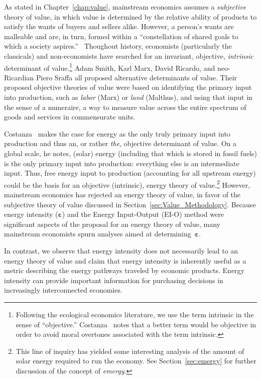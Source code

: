 As stated in Chapter~\ref{chap:value}, mainstream economics assumes a
\emph{subjective} theory of value, 
in which value is determined by the relative ability 
of products to satisfy the wants of buyers and sellers alike.
However, a person's wants are malleable and are, in turn, formed within a 
``constellation of shared goals to which a society aspires.''~\cite{Costanza:2004we}
Thoughout history, economists (particularly the classicals) 
and non-economists have searched for an invariant, objective, 
\emph{intrinsic} determinant of value.\footnote{Following the ecological economics literature, 
	we use the term intrinsic in the sense of ``objective.'' Costanza~\cite{Costanza:2004we} 
	notes that a better term would be objective in order to avoid moral overtones associated 
	with the term intrinsic.} 
Adam Smith, Karl Marx, David Ricardo, and neo-Ricardian Piero Sraffa all proposed 
alternative determinants of value.  
Their proposed objective theories of value were based 
on identifying the primary input into production,
such as \emph{labor} (Marx) or \emph{land} (Malthus), 
and using that input in the sense of a numeraire, 
a way to measure value across the entire spectrum 
of goods and services in commensurate units.

Costanza~\cite{Costanza:2004we} makes the case for energy 
as the only truly primary input into production 
and thus an, or rather \emph{the}, objective determinant of value. 
On a global scale, he notes, (solar) energy 
(including that which is stored in fossil fuels) is 
the only primary input into production:
everything else is an intermediate input. 
Thus, free energy input to production (accounting for all upstream energy)
could be the basis for an objective (intrinsic), 
energy theory of value.\footnote{This line 
	of inquiry has yielded some interesting analysis of the amount 
	of solar energy required to run the economy. 
	See Section~\ref{sec:emergy} for further discussion of the concept of \emph{emergy}.}
However, mainstream economics has rejected an energy theory of value, 
in favor of the subjective theory of value discussed in Section~\ref{sec:Value_Methodology}.
Because energy intensity ($\boldsymbol{\varepsilon}$) 
and the Energy Input-Output (EI-O) method 
were significant aspects of the 
proposal for an energy theory of value, 
many mainstream economists spurn 
analyses aimed at determining~$\boldsymbol{\varepsilon}$.

In contrast, we observe that energy intensity 
does not necessarily lead to an energy theory of value
and claim that energy intensity is inherently useful
as a metric describing the energy pathways traveled by economic products.
Energy intensity can provide important information for purchasing decisions
in increasingly interconnected economies.


